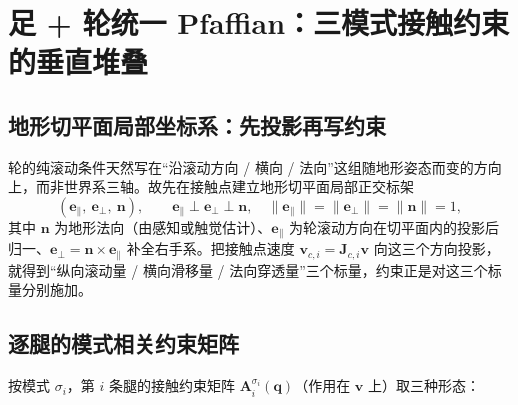 \section{足 + 轮统一 Pfaffian：三模式接触约束的垂直堆叠}
\label{sec:wl-pfaffian}

\subsection{地形切平面局部坐标系：先投影再写约束}

轮的纯滚动条件天然写在“沿滚动方向 / 横向 / 法向”这组随地形姿态而变的方向上，而非世界系三轴。故先在接触点建立地形切平面局部正交标架
\begin{equation}
  (\mathbf{e}_\parallel,\ \mathbf{e}_\perp,\ \mathbf{n}),\qquad
  \mathbf{e}_\parallel\perp\mathbf{e}_\perp\perp\mathbf{n},\quad\|\mathbf{e}_\parallel\|=\|\mathbf{e}_\perp\|=\|\mathbf{n}\|=1,
  \label{eq:wl-frame}
\end{equation}
其中 $\mathbf{n}$ 为地形法向（由感知或触觉估计）、$\mathbf{e}_\parallel$ 为轮滚动方向在切平面内的投影后归一、$\mathbf{e}_\perp=\mathbf{n}\times\mathbf{e}_\parallel$ 补全右手系。把接触点速度 $\mathbf{v}_{c,i}=\mathbf{J}_{c,i}\mathbf{v}$ 向这三个方向投影，就得到“纵向滚动量 / 横向滑移量 / 法向穿透量”三个标量，约束正是对这三个标量分别施加。

\subsection{逐腿的模式相关约束矩阵}

按模式 $\sigma_i$，第 $i$ 条腿的接触约束矩阵 $\mathbf{A}_i^{\sigma_i}(\mathbf{q})$（作用在 $\mathbf{v}$ 上）取三种形态：

